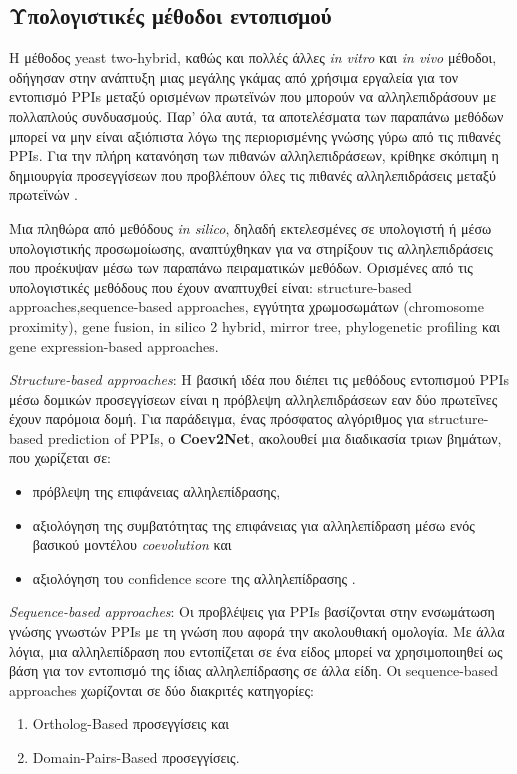  

\subsection{Υπολογιστικές μέθοδοι εντοπισμού}

Η μέθοδος yeast two-hybrid, καθώς και πολλές άλλες \textit{in vitro} και \textit{in vivo} μέθοδοι, οδήγησαν στην ανάπτυξη μιας μεγάλης γκάμας από χρήσιμα εργαλεία για τον εντοπισμό PPIs μεταξύ ορισμένων πρωτεϊνών που μπορούν να αλληλεπιδράσουν με πολλαπλούς συνδυασμούς. Παρ' όλα αυτά, τα αποτελέσματα των παραπάνω μεθόδων μπορεί να μην είναι αξιόπιστα λόγω της περιορισμένης γνώσης γύρω από τις πιθανές PPIs. Για την πλήρη κατανόηση των πιθανών αλληλεπιδράσεων, κρίθηκε σκόπιμη η δημιουργία προσεγγίσεων που προβλέπουν όλες τις πιθανές αλληλεπιδράσεις μεταξύ πρωτεϊνών \cite{Zhang2009}.

Μια πληθώρα από μεθόδους \textit{in silico}, δηλαδή εκτελεσμένες σε υπολογιστή ή μέσω υπολογιστικής προσωμοίωσης, αναπτύχθηκαν για να στηρίξουν τις αλληλεπιδράσεις που προέκυψαν μέσω των παραπάνω πειραματικών μεθόδων. Ορισμένες από τις υπολογιστικές μεθόδους που έχουν αναπτυχθεί είναι:
structure-based approaches,sequence-based approaches, εγγύτητα χρωμοσωμάτων (chromosome proximity), gene fusion, in silico 2 hybrid, mirror tree, phylogenetic profiling και gene expression-based approaches.

\medskip
\textit{Structure-based approaches}: Η βασική ιδέα που διέπει τις μεθόδους εντοπισμού PPIs μέσω δομικών προσεγγίσεων είναι η πρόβλεψη αλληλεπιδράσεων εαν δύο πρωτεΐνες έχουν παρόμοια δομή. Για παράδειγμα, ένας πρόσφατος αλγόριθμος για structure-based prediction of PPIs, ο \textbf{Coev2Net}, ακολουθεί μια διαδικασία τριων βημάτων, που χωρίζεται σε:

\begin{itemize}
    \item πρόβλεψη της επιφάνειας αλληλεπίδρασης,
    \item αξιολόγηση της συμβατότητας της επιφάνειας για αλληλεπίδραση μέσω ενός βασικού μοντέλου \textit{coevolution} και
    \item αξιολόγηση του confidence score της αλληλεπίδρασης \cite{Hosur2011}.
\end{itemize}

\newpage
\textit{Sequence-based approaches}: Οι προβλέψεις για PPIs βασίζονται στην ενσωμάτωση γνώσης γνωστών PPIs με τη γνώση που αφορά την ακολουθιακή ομολογία. Με άλλα λόγια, μια αλληλεπίδραση που εντοπίζεται σε ένα είδος μπορεί να χρησιμοποιηθεί ως βάση για τον εντοπισμό της ίδιας αλληλεπίδρασης σε άλλα είδη. Οι sequence-based approaches χωρίζονται σε δύο διακριτές κατηγορίες:
\begin{enumerate}
    \item Ortholog-Based προσεγγίσεις και
    \item Domain-Pairs-Based προσεγγίσεις.
\end{enumerate}

